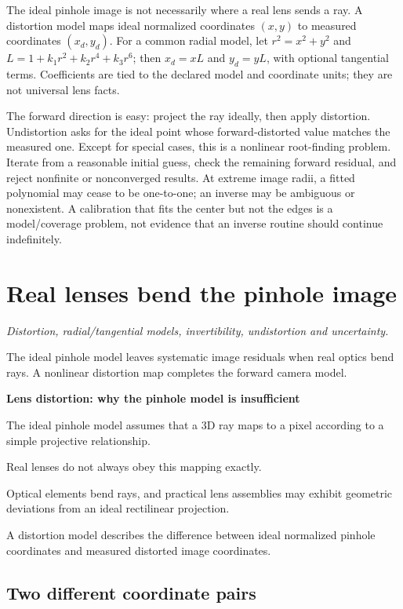 The ideal pinhole image is not necessarily where a real lens sends a ray. A distortion model maps ideal normalized coordinates \((x,y)\) to measured coordinates \((x_d,y_d)\). For a common radial model, let \(r^2=x^2+y^2\) and \(L=1+k_1r^2+k_2r^4+k_3r^6\); then \(x_d=xL\) and \(y_d=yL\), with optional tangential terms. Coefficients are tied to the declared model and coordinate units; they are not universal lens facts.

The forward direction is easy: project the ray ideally, then apply distortion. Undistortion asks for the ideal point whose forward-distorted value matches the measured one. Except for special cases, this is a nonlinear root-finding problem. Iterate from a reasonable initial guess, check the remaining forward residual, and reject nonfinite or nonconverged results. At extreme image radii, a fitted polynomial may cease to be one-to-one; an inverse may be ambiguous or nonexistent. A calibration that fits the center but not the edges is a model/coverage problem, not evidence that an inverse routine should continue indefinitely.

\section{Real lenses bend the pinhole image}\label{02-foundations-ii-ch035-real-lenses-bend-the-pinhole-image}

\emph{Distortion, radial/tangential models, invertibility, undistortion and uncertainty.}

The ideal pinhole model leaves systematic image residuals when real optics bend rays. A nonlinear distortion map completes the forward camera model.

\textbf{Lens distortion: why the pinhole model is insufficient}

The ideal pinhole model assumes that a 3D ray maps to a pixel according to a simple projective relationship.

Real lenses do not always obey this mapping exactly.

Optical elements bend rays, and practical lens assemblies may exhibit geometric deviations from an ideal rectilinear projection.

A distortion model describes the difference between ideal normalized pinhole coordinates and measured distorted image coordinates.

\subsection{Two different coordinate pairs}\label{02-foundations-ii-ch035-two-different-coordinate-pairs}

